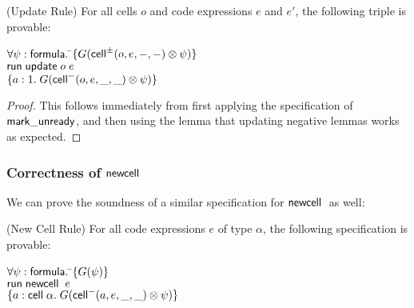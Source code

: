 \begin{lemma}{(Update Rule)}
For all cells $o$ and code expressions $e$ and $e'$, the following
triple is provable: 

\begin{tabbing}
$\forall \psi:\mathsf{formula}.\; $\=$\{{G(\mathsf{cell}^{\pm}({o}, {e}, {-}, {-}) \otimes \psi)}\}$ \\
                           \>$\mathsf{run}\; {\mathsf{update}\;o\;e}$ \\
                           \>$\{{a:1.\; G(\mathsf{cell}^{-}({o}, {e}, {\_}, {\_}) \otimes \psi)}\}$
\end{tabbing}
\end{lemma}

\begin{proof}
This follows immediately from first applying the specification of $\mathsf{mark\_unready}$, 
and then using the lemma that updating negative lemmas works as expected. 
\end{proof}


\subsubsection{Correctness of $\mathsf{newcell}\;$}

We can prove the soundness of a similar specification for $\mathsf{newcell}\;$ as
well:

\begin{prop}{(New Cell Rule)}
For all code expressions $e$ of type $\alpha$, the following specification is provable: 
\begin{tabbing}
$\forall \psi:\mathsf{formula}.\; $\=$\{{G(\psi)}\}$ \\
                           \>$\mathsf{run}\;{\mathsf{newcell}\;\;e}$ \\
                           \>$\{{a:\mathsf{cell}\;{\alpha}.\; G(\mathsf{cell}^{-}({a}, {e}, {\_}, {\_}) \otimes \psi)}\}$
\end{tabbing}
\end{prop}

